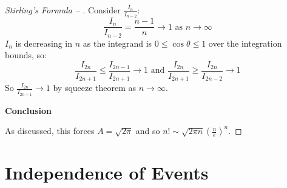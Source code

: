 \documentclass[../main.tex]{subfiles}
\begin{document}
\begin{proof}[Stirling's Formula -- ]
  Consider $\frac{I_n}{I_{n - 2}}$:
  \[
    \frac{I_n}{I_{n - 2}} = \frac{n - 1}{n} \to 1 \text{ as $n \to \infty$}
  \]
  $I_n$ is decreasing in $n$ as the integrand is $0 \leq \cos \theta \leq 1$ over the integration bounds, so:
  \[
    \frac{I_{2n}}{I_{2n + 1}} \leq \frac{I_{2n - 1}}{I_{2n + 1}} \to 1 \text{ and } \frac{I_{2n}}{I_{2n + 1}} \geq \frac{I_{2n}}{I_{2n - 2}} \to 1
  \]
  So $\frac{I_{2n}}{I_{2n + 1}} \to 1$ by squeeze theorem as $n \to \infty$.

  \textbf{Conclusion}\par
  As discussed, this forces $A = \sqrt{2\pi}$ and so $n! \sim \sqrt{2\pi n} \left(\frac{n}{e}\right)^{n}$.
\end{proof}
\section{Independence of Events}
\end{document}
